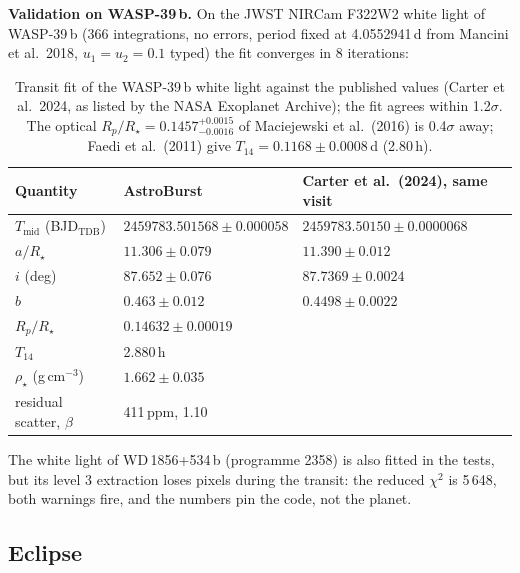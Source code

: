 \documentclass[11pt,a4paper]{article}
\begin{document}
    \textbf{Validation on WASP-39\,b.} On the JWST NIRCam F322W2 white light of WASP-39\,b (366 integrations, no errors, period fixed at 4.0552941\,d from Mancini et al.\ 2018, $u_1 = u_2 = 0.1$ typed) the fit converges in 8 iterations:

    \begin{table}[H]
        \centering
        \small
        \begin{tabular}{lll}
            \toprule
            \textbf{Quantity} & \textbf{AstroBurst} & \textbf{Carter et al.\ (2024), same visit} \\
            \midrule
            $T_{\text{mid}}$ (BJD$_{\text{TDB}}$) & $2459783.501568 \pm 0.000058$ & $2459783.50150 \pm 0.0000068$ \\
            $a/R_\star$ & $11.306 \pm 0.079$ & $11.390 \pm 0.012$ \\
            $i$ (deg) & $87.652 \pm 0.076$ & $87.7369 \pm 0.0024$ \\
            $b$ & $0.463 \pm 0.012$ & $0.4498 \pm 0.0022$ \\
            $R_p/R_\star$ & $0.14632 \pm 0.00019$ & \\
            $T_{14}$ & 2.880\,h & \\
            $\rho_\star$ (g\,cm$^{-3}$) & $1.662 \pm 0.035$ & \\
            residual scatter, $\beta$ & 411\,ppm, 1.10 & \\
            \bottomrule
        \end{tabular}
        \caption{Transit fit of the WASP-39\,b white light against the published values (Carter et al.\ 2024, as listed by the NASA Exoplanet Archive); the fit agrees within 1.2$\sigma$. The optical $R_p/R_\star = 0.1457^{+0.0015}_{-0.0016}$ of Maciejewski et al.\ (2016) is 0.4$\sigma$ away; Faedi et al.\ (2011) give $T_{14} = 0.1168 \pm 0.0008$\,d (2.80\,h).}
    \end{table}

    The white light of WD\,1856+534\,b (programme 2358) is also fitted in the tests, but its level 3 extraction loses pixels during the transit: the reduced $\chi^2$ is 5\,648, both warnings fire, and the numbers pin the code, not the planet.

    \subsection{Eclipse}
    \label{sec:eclipse}
\end{document}
